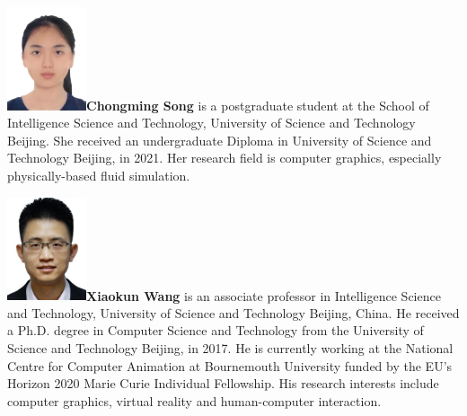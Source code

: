 \documentclass[VANCOUVER,STIX1COL]{WileyNJD-v2}
\providecommand{\DIFaddbegin}{} %
\providecommand{\DIFaddend}{} %
\providecommand{\DIFdelbegin}{} %
\providecommand{\DIFdelend}{} %
\begin{document}
\DIFdelbegin %
\DIFdelend \DIFaddbegin \begin{biography}{\includegraphics[width=66pt,height=86pt]{VANCOUVER/figure/photos/ChongmingSong.JPG}}{\textbf{Chongming Song} is a postgraduate student  at the School of Intelligence Science and Technology, University of Science and Technology Beijing. She received an undergraduate Diploma in University of Science and Technology Beijing, in 2021. Her research field is computer graphics, especially physically-based fluid simulation.}
\DIFaddend \end{biography}

\vspace{7ex}

\DIFdelbegin %
\DIFdelend \DIFaddbegin \begin{biography}{\includegraphics[width=66pt,height=86pt]{VANCOUVER/figure/photos/XiaokunWang.jpg}}{\textbf{Xiaokun Wang} is an associate professor in Intelligence Science and Technology, University of Science and Technology Beijing, China. He received a Ph.D. degree in Computer Science and Technology from the University of Science and Technology Beijing, in 2017. He is currently working at the National Centre for Computer Animation at Bournemouth University funded by the EU's Horizon 2020 Marie Curie Individual Fellowship. His research interests include computer graphics, virtual reality and human-computer interaction.}
\DIFaddend \end{biography}
\end{document}
